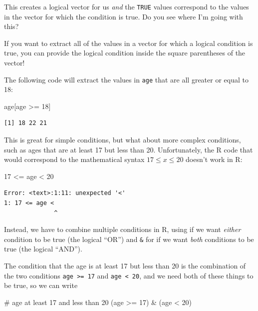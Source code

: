 \documentclass[
  letterpaper,
  DIV=11,
  numbers=noendperiod]{scrreprt}
\newenvironment{Shaded}{\begin{snugshade}}{\end{snugshade}}
\newcommand{\CommentTok}[1]{\textcolor[rgb]{0.37,0.37,0.37}{#1}}
\newcommand{\DecValTok}[1]{\textcolor[rgb]{0.68,0.00,0.00}{#1}}
\newcommand{\NormalTok}[1]{\textcolor[rgb]{0.00,0.23,0.31}{#1}}
\newcommand{\SpecialCharTok}[1]{\textcolor[rgb]{0.37,0.37,0.37}{#1}}
\begin{document}
This creates a logical vector for us \emph{and} the \texttt{TRUE} values
correspond to the values in the vector for which the condition is true.
Do you see where I'm going with this?

If you want to extract all of the values in a vector for which a logical
condition is true, you can provide the logical condition inside the
square parentheses of the vector!

The following code will extract the values in \texttt{age} that are all
greater or equal to 18:

\begin{Shaded}
\begin{Highlighting}[]
\NormalTok{age[age }\SpecialCharTok{\textgreater{}=} \DecValTok{18}\NormalTok{]}
\end{Highlighting}
\end{Shaded}

\begin{verbatim}
[1] 18 22 21
\end{verbatim}

This is great for simple conditions, but what about more complex
conditions, such as ages that are at least 17 but less than 20.
Unfortunately, the R code that would correspond to the mathematical
syntax \(17 \leq x \leq 20\) doesn't work in R:

\begin{Shaded}
\begin{Highlighting}[]
\DecValTok{17} \SpecialCharTok{\textless{}=}\NormalTok{ age }\SpecialCharTok{\textless{}} \DecValTok{20}
\end{Highlighting}
\end{Shaded}

\begin{verbatim}
Error: <text>:1:11: unexpected '<'
1: 17 <= age <
              ^
\end{verbatim}

Instead, we have to combine multiple conditions in R, using
\texttt{\textbar{}} if we want \emph{either} condition to be true (the
logical ``OR'') and \texttt{\&} for if we want \emph{both} conditions to
be true (the logical ``AND'').

The condition that the age is at least 17 but less than 20 is the
combination of the two conditions \texttt{age\ \textgreater{}=\ 17} and
\texttt{age\ \textless{}\ 20}, and we need both of these things to be
true, so we can write

\begin{Shaded}
\begin{Highlighting}[]
\CommentTok{\# age at least 17 and less than 20}
\NormalTok{(age }\SpecialCharTok{\textgreater{}=} \DecValTok{17}\NormalTok{) }\SpecialCharTok{\&}\NormalTok{ (age }\SpecialCharTok{\textless{}} \DecValTok{20}\NormalTok{)}
\end{Highlighting}
\end{Shaded}
\end{document}
